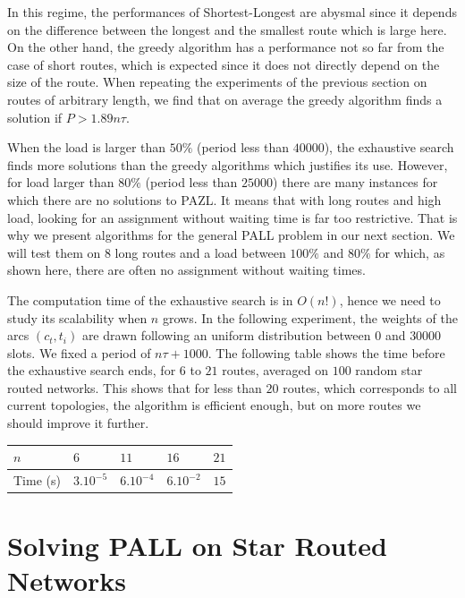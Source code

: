 \documentclass[10pt, conference, letterpaper]{IEEEtran}
\begin{document}
      In this regime, the performances of Shortest-Longest are abysmal since it depends on the difference between the longest and the smallest route which is large here. On the other hand, the greedy algorithm has a performance not so far from the case of short routes, which is expected since it does not directly depend on the size of the route. When repeating the experiments of the previous section on routes of arbitrary length, we find that on average the greedy algorithm finds a solution if $P>1.89n\tau$.
      
      When the load is larger than $50\%$ (period less than $40000$), the exhaustive search finds  more solutions than the greedy algorithms which justifies its use. However, for load larger than $80\%$ (period less than $25000$) there are many instances for which there are no solutions to PAZL.
      It means that with long routes and high load, looking for an assignment without waiting time is far too restrictive. That is why we present algorithms for the general PALL problem in our next section. We will test them on $8$ long routes and a load between $100\%$ and $80\%$ for which, as shown here, there are often no assignment without waiting times.
      
      The computation time of the exhaustive search is in $O(n!)$, hence we need to study its scalability when $n$ grows. In the following experiment, the weights of the arcs $(c_t,t_i)$ are drawn following an uniform distribution between $0$ and $30000$ slots. We fixed a period of $n\tau+1000$.
      The following table shows the time before the exhaustive search ends, for $6$ to $21$ routes, averaged on $100$ random star routed networks. This shows that for less than $20$ routes, which corresponds to all current topologies, the algorithm is efficient enough, but on more routes we should improve it further.
         \begin{center}
         \begin{tabularx}{0.5\textwidth}{|l|X|X|X|X|}
    \hline
   $n$ & $6$ & $11$& $16$& $21$\\
    \hline
   Time (s) & $3.10^{-5}$&$6.10^{-4}$&$6.10^{-2}$& $15$\\
    \hline
      \end{tabularx}
      \end{center}
      

     
   \section{Solving PALL on Star Routed Networks}\label{sec:PALL}
    
\end{document}
